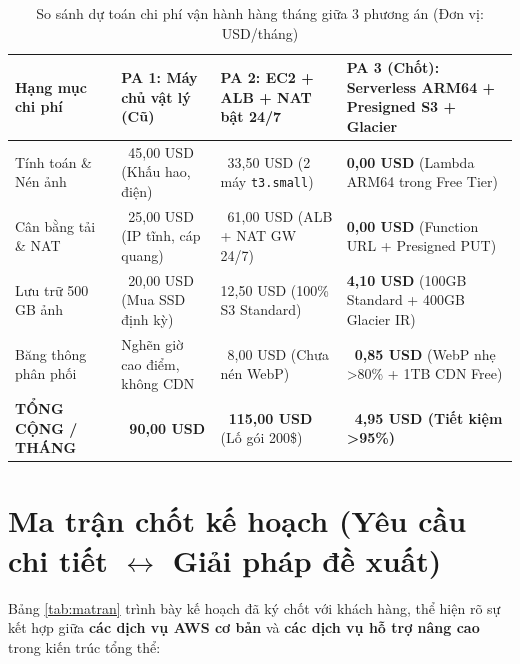 \documentclass[12pt,a4paper]{report}
\begin{document}
\begin{table}[H]
  \centering
  \caption{So sánh dự toán chi phí vận hành hàng tháng giữa 3 phương án (Đơn vị: USD/tháng)}
  \label{tab:finops}
  \footnotesize
  \renewcommand{\arraystretch}{1.25}
  \begin{tabularx}{\textwidth}{|L{3.1cm}|Y|Y|Y|}
    \hline
    \textbf{Hạng mục chi phí} & \textbf{PA 1: Máy chủ vật lý (Cũ)} & \textbf{PA 2: EC2 + ALB + NAT bật 24/7} & \textbf{PA 3 (Chốt): Serverless ARM64 + Presigned S3 + Glacier} \\
    \hline
    Tính toán \& Nén ảnh & ~45,00 USD (Khấu hao, điện) & ~33,50 USD (2 máy \texttt{t3.small}) & \textbf{0,00 USD} (Lambda ARM64 trong Free Tier) \\ \hline
    Cân bằng tải \& NAT & ~25,00 USD (IP tĩnh, cáp quang) & ~61,00 USD (ALB + NAT GW 24/7) & \textbf{0,00 USD} (Function URL + Presigned PUT) \\ \hline
    Lưu trữ 500 GB ảnh & ~20,00 USD (Mua SSD định kỳ) & 12,50 USD (100\% S3 Standard) & \textbf{4,10 USD} (100GB Standard + 400GB Glacier IR) \\ \hline
    Băng thông phân phối & Nghẽn giờ cao điểm, không CDN & ~8,00 USD (Chưa nén WebP) & \textbf{~0,85 USD} (WebP nhẹ >80\% + 1TB CDN Free) \\ \hline
    \textbf{TỔNG CỘNG / THÁNG} & \textbf{~90,00 USD} & \textbf{~115,00 USD} (Lố gói 200\$) & \textbf{~4,95 USD (Tiết kiệm >95\%)} \\ \hline
  \end{tabularx}
\end{table}

\section{Ma trận chốt kế hoạch (Yêu cầu chi tiết $\leftrightarrow$ Giải pháp đề xuất)}
Bảng \ref{tab:matran} trình bày kế hoạch đã ký chốt với khách hàng, thể hiện rõ sự kết hợp giữa \textbf{các dịch vụ AWS cơ bản} và \textbf{các dịch vụ hỗ trợ nâng cao} trong kiến trúc tổng thể:
\end{document}

